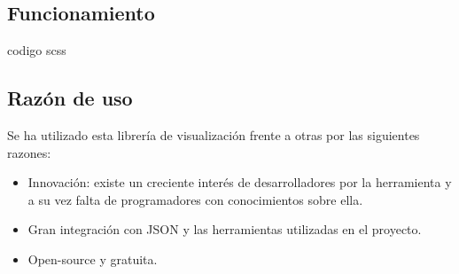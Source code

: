 \subsection{Funcionamiento}

\begin{codigo}
	codigo scss
\end{codigo}


\subsection{Razón de uso}
Se ha utilizado esta librería de visualización frente a otras por las siguientes razones:

\begin{itemize}
	\item Innovación: existe un creciente interés de desarrolladores por la herramienta y a su vez falta de programadores con conocimientos sobre ella.
	\item Gran integración con JSON y las herramientas utilizadas en el proyecto.
	\item Open-source y gratuita. 
\end{itemize}
